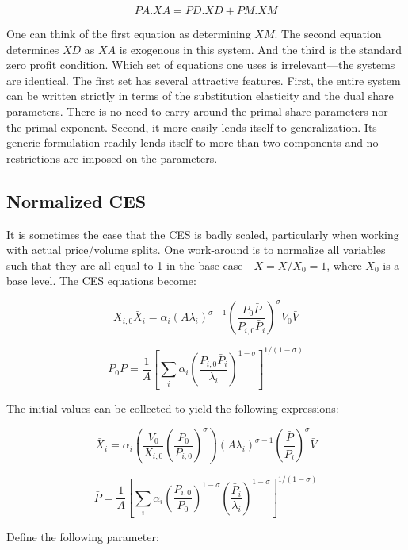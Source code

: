 \begin{displaymath}
\mathit{PA}.\mathit{XA}=\mathit{PD}.\mathit{XD}+\mathit{PM}.\mathit{XM}
\end{displaymath}

One can think of the first equation as determining $\mathit{XM}$. The  second equation determines
$\mathit{XD}$ as $\mathit{XA}$ is exogenous in this system. And the third is the standard zero
profit condition. Which set of equations one uses is irrelevant---the systems are identical.
The first set has several attractive features. First, the entire system can be written strictly
in terms of the substitution elasticity and the dual share parameters. There is no need to carry
around the primal share parameters nor the primal exponent. Second, it more easily lends itself to
generalization. Its generic formulation readily lends itself to more than two components and
no restrictions are imposed on the parameters.

\fi

\subsection{Normalized CES}

It is sometimes the case that the CES is badly scaled, particularly when working with actual
price/volume splits. One work-around is to normalize all variables such that they are all
equal to 1 in the base case---$\bar{X} = X/X_0 = 1$, where $X_0$ is a base level. The CES
equations become:

\[
X_{i,0} \bar{X}_i = \alpha_i
{\left( A \lambda_i \right)}^{\sigma-1}
{\left( \frac{ P_0 \bar{P}} {P_{i,0} \bar{P}_i } \right)}^{\sigma} V_0 \bar{V}
\]

\[
P_0\bar{P} = \frac{1}{A}
\left[ \sum_i{
\alpha_i \left(\frac{P_{i,0}\bar{P}_i}{\lambda_i} \right)^{1-\sigma}
}
\right]^{1/(1-\sigma)}
\]

\noindent The initial values can be collected to yield the following expressions:

\[
\bar{X}_i = \alpha_i
\left( \frac{V_0}{X_{i,0}} \left(\frac{P_0}{P_{i,0}} \right)^{\sigma} \right)
{\left( A \lambda_i \right)}^{\sigma-1}
{\left( \frac{\bar{P}} {\bar{P}_i } \right)}^{\sigma} \bar{V}
\]

\[
\bar{P} = \frac{1}{A}
\left[ \sum_i{
\alpha_i
\left(\frac{P_{i,0}}{P_0} \right)^{1-\sigma}
\left(\frac{\bar{P}_i}{\lambda_i} \right)^{1-\sigma}
}
\right]^{1/(1-\sigma)}
\]

\noindent Define the following parameter:

